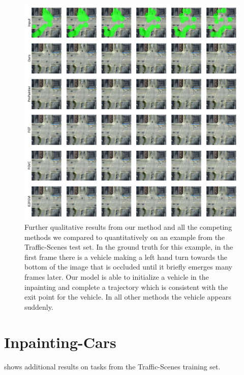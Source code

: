 \begin{figure}[h]
\begin{center}
    \centering
    \captionsetup{type=figure}
    \includegraphics[width=\linewidth]{figures/additional-samples/ts2.pdf}
    \caption{Further qualitative results from our method and all the competing methods we compared to quantitatively on an example from the Traffic-Scenes test set. In the ground truth for this example, in the first frame there is a vehicle making a left hand turn towards the bottom of the image that is occluded until it briefly emerges many frames later. Our model is able to initialize a vehicle in the inpainting and complete a trajectory which is consistent with the exit point for the vehicle. In all other methods the vehicle appears suddenly. } 
    \label{fig:ts2}
\end{center}
\end{figure}

\section{Inpainting-Cars}
 shows additional results on tasks from the Traffic-Scenes training set.

